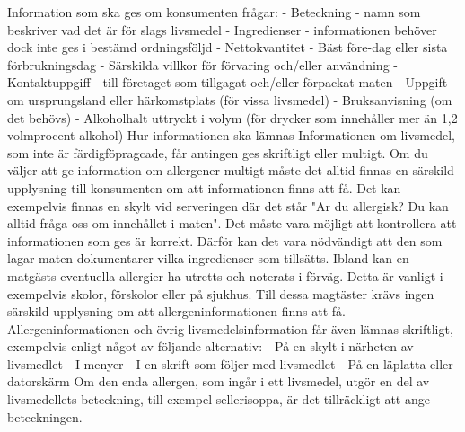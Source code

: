 Information som ska ges om konsumenten frågar:
- Beteckning - namn som beskriver vad det är för slags livsmedel
- Ingredienser - informationen behöver dock inte ges i bestämd ordningsföljd
- Nettokvantitet
- Bäst före-dag eller sista förbrukningsdag
- Särskilda villkor för förvaring och/eller användning
- Kontaktuppgiff - till företaget som tillgagat och/eller förpackat maten
- Uppgift om ursprungsland eller härkomstplats (för vissa livsmedel)
- Bruksanvisning (om det behövs)
- Alkoholhalt uttryckt i volym (för drycker som innehåller mer än 1,2 volmprocent alkohol)
Hur informationen ska lämnas
Informationen om livsmedel, som inte är färdigföpragcade, får antingen ges skriftligt eller multigt. Om du väljer att ge information om allergener multigt måste det alltid finnas en särskild upplysning till konsumenten om att informationen finns att få. Det kan exempelvis finnas en skylt vid serveringen där det står "Ar du allergisk? Du kan alltid fråga oss om innehållet i maten". Det måste vara möjligt att kontrollera att informationen som ges är korrekt. Därför kan det vara nödvändigt att den som lagar maten dokumentarer vilka ingredienser som tillsätts.
Ibland kan en matgästs eventuella allergier ha utretts och noterats i förväg. Detta är vanligt i exempelvis skolor, förskolor eller på sjukhus. Till dessa magtäster krävs ingen särskild upplysning om att allergeninformationen finns att få.
Allergeninformationen och övrig livsmedelsinformation får även lämnas skriftligt, exempelvis enligt något av följande alternativ:
- På en skylt i närheten av livsmedlet
- I menyer
- I en skrift som följer med livsmedlet
- På en läplatta eller datorskärm
Om den enda allergen, som ingår i ett livsmedel, utgör en del av livsmedellets beteckning, till exempel sellerisoppa, är det tillräckligt att ange beteckningen.
